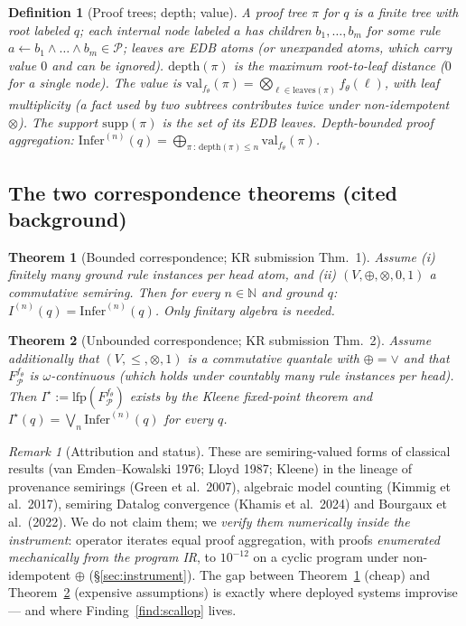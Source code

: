 \documentclass[10pt]{article}
\newtheorem{definition}{Definition}[section]
\newtheorem{theorem}{Theorem}
\theoremstyle{remark}
\newtheorem{remark}{Remark}
\newcommand{\Infer}{\mathrm{Infer}}
\newcommand{\val}{\mathrm{val}}
\newcommand{\lfp}{\mathrm{lfp}}
\begin{document}
\begin{definition}[Proof trees; depth; value]\label{def:proofs}
A \emph{proof tree} $\pi$ for $q$ is a finite tree with root labeled $q$; each internal node
labeled $a$ has children $b_1,\dots,b_m$ for some rule $a \leftarrow b_1\wedge\dots\wedge b_m \in
\mathcal P$; leaves are EDB atoms (or unexpanded atoms, which carry value $0$ and can be ignored).
$\mathrm{depth}(\pi)$ is the maximum root-to-leaf distance ($0$ for a single node). The
\emph{value} is $\val_{f_\theta}(\pi) = \bigotimes_{\ell \in \mathrm{leaves}(\pi)}
f_\theta(\ell)$, with leaf multiplicity (a fact used by two subtrees contributes twice under
non-idempotent $\otimes$). The \emph{support} $\mathrm{supp}(\pi)$ is the \emph{set} of its EDB
leaves. \emph{Depth-bounded proof aggregation}:
$\Infer^{(n)}(q) = \bigoplus_{\pi \,:\, \mathrm{depth}(\pi) \le n} \val_{f_\theta}(\pi)$.
\end{definition}

\subsection{The two correspondence theorems (cited background)}

\begin{theorem}[Bounded correspondence; KR submission Thm.~1]\label{thm:bounded}
Assume (i) finitely many ground rule instances per head atom, and (ii) $(V,\oplus,\otimes,0,1)$ a
commutative semiring. Then for every $n \in \mathbb N$ and ground $q$:\;
$I^{(n)}(q) = \Infer^{(n)}(q)$. Only \emph{finitary} algebra is needed.
\end{theorem}

\begin{theorem}[Unbounded correspondence; KR submission Thm.~2]\label{thm:unbounded}
Assume additionally that $(V,\le,\otimes,1)$ is a commutative quantale with $\oplus = \vee$ and
that $F^{f_\theta}_{\mathcal P}$ is $\omega$-continuous (which holds under countably many rule
instances per head). Then $I^\star := \lfp(F^{f_\theta}_{\mathcal P})$ exists by the Kleene
fixed-point theorem and $I^\star(q) = \bigvee_n \Infer^{(n)}(q)$ for every $q$.
\end{theorem}

\begin{remark}[Attribution and status]\label{rem:attribution}
These are semiring-valued forms of classical results (van Emden--Kowalski 1976; Lloyd 1987; Kleene)
in the lineage of provenance semirings (Green et al.\ 2007), algebraic model counting (Kimmig et
al.\ 2017), semiring Datalog convergence (Khamis et al.\ 2024) and Bourgaux et al.\ (2022). We do
not claim them; we \emph{verify them numerically inside the instrument}: operator iterates equal
proof aggregation, with proofs \emph{enumerated mechanically from the program IR}, to $10^{-12}$
on a cyclic program under non-idempotent $\oplus$ (\S\ref{sec:instrument}). The gap between
Theorem~\ref{thm:bounded} (cheap) and Theorem~\ref{thm:unbounded} (expensive assumptions) is
exactly where deployed systems improvise --- and where Finding~\ref{find:scallop} lives.
\end{remark}
\end{document}
